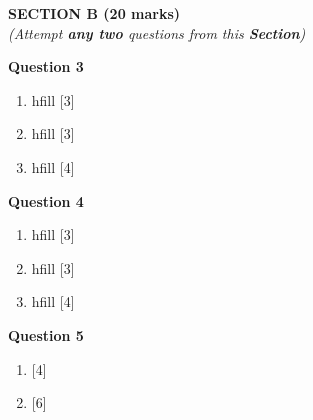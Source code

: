 \newpage
\begin{center}
   \large
   \textbf{SECTION B (20 marks)}\\
   \vspace{5mm}
   \normalsize
   \textit{(Attempt \textbf{any two} questions from this \textbf{Section})}
\end{center}
\par

\noindent
\textbf{Question 3}
\begin{enumerate}[label=(\roman*)]

    \item hfill [3]

    \item hfill [3]

    \item hfill [4]

\end{enumerate}

\noindent
\textbf{Question 4}
\begin{enumerate}[label=(\roman*)]

    \item hfill [3]

    \item hfill [3]

    \item hfill [4]

\end{enumerate}

\newpage
\noindent
\textbf{Question 5}
\begin{enumerate}[label=(\roman*)]

    \item \hfill [4]

    \item \hfill [6]

\end{enumerate}


